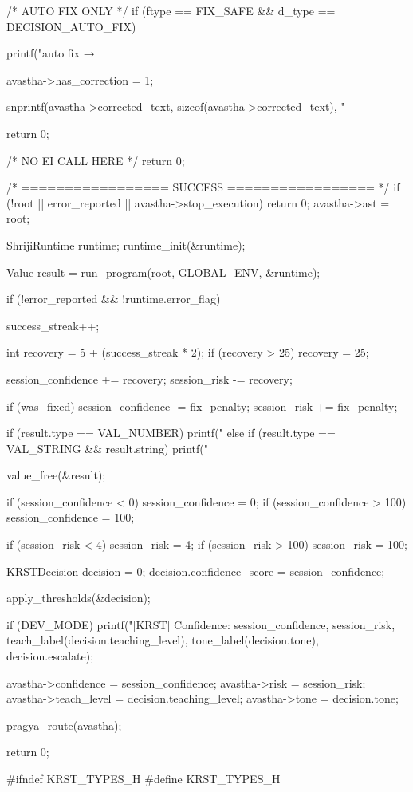 \documentclass{article}
\begin{document}
{{        /* AUTO FIX ONLY */
        if (ftype == FIX_SAFE && d_type == DECISION_AUTO_FIX)
        {
            printf("\n[Shriji] auto fix → %

            avastha->has_correction = 1;

            snprintf(avastha->corrected_text,
                     sizeof(avastha->corrected_text),
                     "%

            return 0;
        }

        /*  NO EI CALL HERE */
        return 0;
    }

    /* ================= SUCCESS ================= */
   if (!root || error_reported || avastha->stop_execution)
{
    return 0;
}
    avastha->ast = root;

    ShrijiRuntime runtime;
    runtime_init(&runtime);

    Value result = run_program(root, GLOBAL_ENV, &runtime);

    if (!error_reported && !runtime.error_flag)
{
        success_streak++;

        int recovery = 5 + (success_streak * 2);
        if (recovery > 25) recovery = 25;

        session_confidence += recovery;
        session_risk -= recovery;

        if (was_fixed)
        {
            session_confidence -= fix_penalty;
            session_risk += fix_penalty;
        }

        if (result.type == VAL_NUMBER)
            printf("%
        else if (result.type == VAL_STRING && result.string)
            printf("%
    }

    value_free(&result);

    if (session_confidence < 0) session_confidence = 0;
    if (session_confidence > 100) session_confidence = 100;

    if (session_risk < 4) session_risk = 4;
    if (session_risk > 100) session_risk = 100;

    KRSTDecision decision = {0};
    decision.confidence_score = session_confidence;

    apply_thresholds(&decision);

    if (DEV_MODE)
    {
        printf("[KRST] Confidence: %
               session_confidence,
               session_risk,
               teach_label(decision.teaching_level),
               tone_label(decision.tone),
               decision.escalate);
    }

    avastha->confidence = session_confidence;
    avastha->risk = session_risk;
    avastha->teach_level = decision.teaching_level;
    avastha->tone = decision.tone;

    pragya_route(avastha);

    return 0;
}
#ifndef KRST_TYPES_H
#define KRST_TYPES_H
\end{document}
